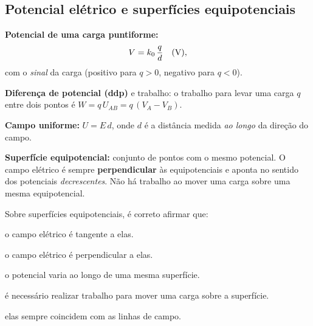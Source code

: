 \subsection{Potencial elétrico e superfícies equipotenciais}

\begin{conceito}
\textbf{Potencial de uma carga puntiforme:}
\[
V = k_{0}\,\frac{q}{d}\quad(\si{\volt}),
\]
com o \emph{sinal} da carga (positivo para $q>0$, negativo para $q<0$).\par
\textbf{Diferença de potencial (ddp)} e trabalho: o trabalho para levar uma carga
$q$ entre dois pontos é $W = q\,U_{AB} = q\,(V_A - V_B)$.\par
\textbf{Campo uniforme:} $U = E\,d$, onde $d$ é a distância medida \emph{ao longo}
da direção do campo.\par
\textbf{Superfície equipotencial:} conjunto de pontos com o mesmo potencial. O
campo elétrico é sempre \textbf{perpendicular} às equipotenciais e aponta no
sentido dos potenciais \emph{decrescentes}. Não há trabalho ao mover uma carga
sobre uma mesma equipotencial.
\end{conceito}

\legendaniveis

\blocofixacao

\begin{questao}[1]{}
Sobre superfícies equipotenciais, é correto afirmar que:
\begin{alternativas}
\item o campo elétrico é tangente a elas.
\item o campo elétrico é perpendicular a elas.
\item o potencial varia ao longo de uma mesma superfície.
\item é necessário realizar trabalho para mover uma carga sobre a superfície.
\item elas sempre coincidem com as linhas de campo.
\end{alternativas}
\end{questao}

